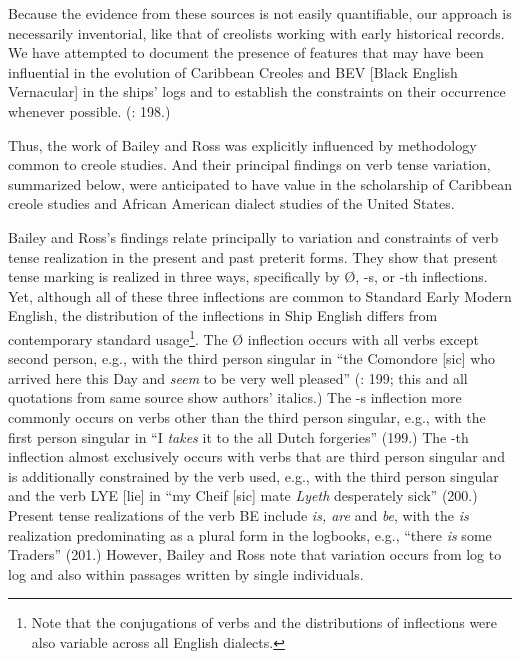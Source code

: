 Because the evidence from these sources is not easily quantifiable, our approach is necessarily inventorial, like that of creolists working with early historical records. We have attempted to document the presence of features that may have been influential in the evolution of Caribbean Creoles and BEV [Black English Vernacular] in the ships’ logs and to establish the constraints on their occurrence whenever possible. (\citealt{BaileyRoss1988}: 198.) 

Thus, the work of Bailey and Ross was explicitly influenced by methodology common to creole studies. And their principal findings on verb tense variation, summarized below, were anticipated to have value in the scholarship of Caribbean creole studies and African American dialect studies of the United States.

Bailey and Ross’s findings relate principally to variation and constraints of verb tense realization in the present and past preterit forms. They show that present tense marking is realized in three ways, specifically by Ø, -s, or -th inflections. Yet, although all of these three inflections are common to Standard Early Modern English, the distribution of the inflections in Ship English differs from contemporary standard usage\footnote{Note that the conjugations of verbs and the distributions of inflections were also variable across all English dialects.}. The Ø inflection occurs with all verbs except second person, e.g., with the third person singular in “the Comondore [sic] who arrived here this Day and \textit{seem} to be very well pleased” (\citealt{BaileyRoss1988}: 199; this and all quotations from same source show authors’ italics.) The -s inflection more commonly occurs on verbs other than the third person singular, e.g., with the first person singular in “I \textit{takes} it to the all Dutch forgeries” (199.) The -th inflection almost exclusively occurs with verbs that are third person singular and is additionally constrained by the verb used, e.g., with the third person singular and the verb LYE [lie] in “my Cheif [sic] mate \textit{Lyeth} desperately sick” (200.) Present tense realizations of the verb BE include \textit{is, are} and \textit{be}, with the \textit{is} realization predominating as a plural form in the logbooks, e.g., “there \textit{is} some Traders” (201.) However, Bailey and Ross note that variation occurs from log to log and also within passages written by single individuals. 

